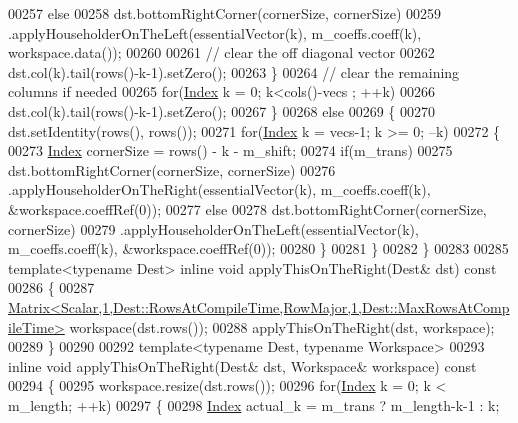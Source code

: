 \begin{DoxyCode}
00257           \textcolor{keywordflow}{else}
00258             dst.bottomRightCorner(cornerSize, cornerSize)
00259                .applyHouseholderOnTheLeft(essentialVector(k), m\_coeffs.coeff(k), workspace.data());
00260 
00261           \textcolor{comment}{// clear the off diagonal vector}
00262           dst.col(k).tail(rows()-k-1).setZero();
00263         \}
00264         \textcolor{comment}{// clear the remaining columns if needed}
00265         \textcolor{keywordflow}{for}(\hyperlink{group___core___module_a554f30542cc2316add4b1ea0a492ff02}{Index} k = 0; k<cols()-vecs ; ++k)
00266           dst.col(k).tail(rows()-k-1).setZero();
00267       \}
00268       \textcolor{keywordflow}{else}
00269       \{
00270         dst.setIdentity(rows(), rows());
00271         \textcolor{keywordflow}{for}(\hyperlink{group___core___module_a554f30542cc2316add4b1ea0a492ff02}{Index} k = vecs-1; k >= 0; --k)
00272         \{
00273           \hyperlink{group___core___module_a554f30542cc2316add4b1ea0a492ff02}{Index} cornerSize = rows() - k - m\_shift;
00274           \textcolor{keywordflow}{if}(m\_trans)
00275             dst.bottomRightCorner(cornerSize, cornerSize)
00276                .applyHouseholderOnTheRight(essentialVector(k), m\_coeffs.coeff(k), &workspace.coeffRef(0));
00277           \textcolor{keywordflow}{else}
00278             dst.bottomRightCorner(cornerSize, cornerSize)
00279                .applyHouseholderOnTheLeft(essentialVector(k), m\_coeffs.coeff(k), &workspace.coeffRef(0));
00280         \}
00281       \}
00282     \}
00283 
00285     \textcolor{keyword}{template}<\textcolor{keyword}{typename} Dest> \textcolor{keyword}{inline} \textcolor{keywordtype}{void} applyThisOnTheRight(Dest& dst)\textcolor{keyword}{ const}
00286 \textcolor{keyword}{    }\{
00287       
      \hyperlink{group___core___module_class_eigen_1_1_matrix}{Matrix<Scalar,1,Dest::RowsAtCompileTime,RowMajor,1,Dest::MaxRowsAtCompileTime>}
       workspace(dst.rows());
00288       applyThisOnTheRight(dst, workspace);
00289     \}
00290 
00292     \textcolor{keyword}{template}<\textcolor{keyword}{typename} Dest, \textcolor{keyword}{typename} Workspace>
00293     \textcolor{keyword}{inline} \textcolor{keywordtype}{void} applyThisOnTheRight(Dest& dst, Workspace& workspace)\textcolor{keyword}{ const}
00294 \textcolor{keyword}{    }\{
00295       workspace.resize(dst.rows());
00296       \textcolor{keywordflow}{for}(\hyperlink{group___core___module_a554f30542cc2316add4b1ea0a492ff02}{Index} k = 0; k < m\_length; ++k)
00297       \{
00298         \hyperlink{group___core___module_a554f30542cc2316add4b1ea0a492ff02}{Index} actual\_k = m\_trans ? m\_length-k-1 : k;

\end{DoxyCode}
